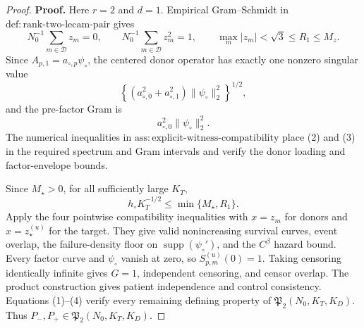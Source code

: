 \documentclass{article}
\begin{document}
\begin{proof}
\textbf{Proof.}
Here \(r=2\) and \(d=1\).  Empirical Gram--Schmidt in
\(\mathrm{def:rank\mbox{-}two\mbox{-}lecam\mbox{-}pair}\) gives
\[
 N_0^{-1}\sum_{m\in\mathcal D}z_m=0,
 \qquad
 N_0^{-1}\sum_{m\in\mathcal D}z_m^2=1,
 \qquad
 \max_m|z_m|<\sqrt3\le R_1\le M_z.                         \tag{1}
\]
Since \(A_{p,1}=a_{\circ,p}\psi_\circ\), the centered donor operator has
exactly one nonzero singular value
\[
 \left\{(a_{\circ,0}^2+a_{\circ,1}^2)
              \|\psi_\circ\|_2^2\right\}^{1/2},             \tag{2}
\]
and the pre-factor Gram is
\[
 a_{\circ,0}^2\|\psi_\circ\|_2^2.                          \tag{3}
\]
The numerical inequalities in
\(\mathrm{ass:explicit\mbox{-}witness\mbox{-}compatibility}\) place (2)
and (3) in the required spectrum and Gram intervals and verify the donor
loading and factor-envelope bounds.

Since \(M_\star>0\), for all sufficiently large \(K_T\),
\[
 h_\circ K_T^{-1/2}\le\min\{M_\star,R_1\}.                  \tag{4}
\]
Apply the four pointwise compatibility inequalities with \(x=z_m\) for
donors and \(x=z_\star^{(u)}\) for the target.  They give valid
nonincreasing survival curves, event overlap, the failure-density floor on
\(\operatorname{supp}(\psi_\circ')\), and the \(C^\beta\) hazard bound.
Every factor curve and \(\psi_\circ\) vanish at zero, so
\(S_{p,m}^{(u)}(0)=1\).  Taking censoring identically infinite gives
\(G=1\), independent censoring, and censor overlap.  The product construction
gives patient independence and control consistency.  Equations (1)--(4)
verify every remaining defining property of
\(\mathfrak P_2(N_0,K_T,K_D)\).  Thus
\(P_-,P_+\in\mathfrak P_2(N_0,K_T,K_D)\).


\end{proof}
\end{document}
